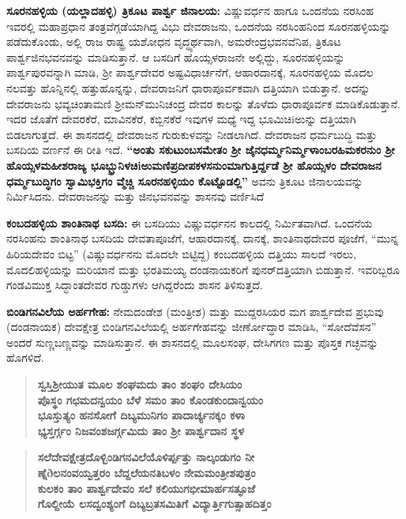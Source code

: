 \textbf{ಸೂರನಹಳ್ಳಿಯ (ಯಲ್ಲಾದಹಳ್ಳಿ) ತ್ರಿಕೂಟ ಪಾರ್ಶ್ವ ಜಿನಾಲಯ:} ವಿಷ್ಣುವರ್ಧನ ಹಾಗೂ ಒಂದನೆಯ ನರಸಿಂಹ ಇವರಲ್ಲಿ ಮಹಾಪ್ರಧಾನ ತಂತ್ರವೆಗ್ಗಡೆಯಾಗಿದ್ದ ವಿಭು ದೇವರಾಜನು, ಒಂದನೆಯ ನರಸಿಂಹನಿಂದ ಸೂರನಹಳ್ಳಿಯನ್ನು ಪಡೆದುಕೊಂಡು, ಅಲ್ಲಿ ರಾಜ ರಾಷ್ಟ್ರ ಯಶೋಧನ ವೃದ್ಧ್ಯರ್ಥವಾಗಿ, ಅಮರೇಂದ್ರಭವನವೆನಿಪ, ತ್ರಿಕೂಟ ಪಾರ್ಶ್ವಜಿನಭವನವನ್ನು ಮಾಡಿಸುತ್ತಾನೆ. ಆ ಬಸದಿಗೆ ಹೊಯ್ಸಳರಾಜನೇ ಅಲ್ಲಿದ್ದು, ಸೂರನಹಳ್ಳಿಯನ್ನು ಪಾರ್ಶ್ವಪುರವನ್ನಾಗಿ ಮಾಡಿ, ಶ‍್ರೀ ಪಾರ್ಶ್ವದೇವರ ಅಷ್ಟವಿಧಾರ್ಚನೆಗೆ, ಆಹಾರದಾನಕ್ಕೆ, ಸೂರನಹಳ್ಳಿಯ ಮೊದಲ ನಲವತ್ತು ಹೊನ್ನಿನಲ್ಲಿ ಹತ್ತುಹೊನ್ನನ್ನು, ದೇವರಾಜನಿಗೆ ಧಾರಾಪೂರ್ವಕವಾಗಿ ದತ್ತಿಯಾಗಿ ಬಿಡುತ್ತಾನೆ. ಅದನ್ನು ದೇವರಾಜನು ಭವ್ಯಚಿಂತಾಮಣಿ ಶ‍್ರೀಮನ್​ಮುನಿಚಂದ್ರ ದೇವರ ಕಾಲನ್ನು ತೊಳೆದು ಧಾರಾಪೂರ್ವಕ ಮಾಡಿಕೊಡುತ್ತಾನೆ. ಇದರ ಜೊತೆಗೆ ದೇವರಕೆರೆ, ಮಾವಿನಕೆರೆ, ಕಬ್ಬಿನಕೆರೆ ಇವುಗಳ ಮಧ್ಯೆ ಇದ್ದ ಭೂಮಿಚಿiಅುನ್ನು ದತ್ತಿಯಾಗಿ ಬಿಡಲಾಗುತ್ತದೆ. ಈ ಶಾಸನದಲ್ಲಿ ದೇವರಾಜನ ಗುರುಕುಳವನ್ನು ನೀಡಲಾಗಿದೆ. ದೇವರಾಜನ ಧರ್ಮಬುದ್ಧಿ ಮತ್ತು ಬಸದಿಯ ವರ್ಣನೆ ಈ ರೀತಿ ಇದೆ. \textbf{“ಅಂತು ಸಕುಟುಂಬಸಮೇತಂ ಶ‍್ರೀ ಜೈನಧರ್ಮ್ಮನಿರ್ಮ್ಮಳಾಂಬರಹಿಮಕರನುಂ ಶ‍್ರೀ ಹೊಯ್ಸಳಮಹೀಶರಾಜ್ಯ ಭೂಭ್ಭ್ರುನಿಳಚಿiಅುಮಣಿಪ್ರದೀಪಕಳಸನುಂಮಾಗುತ್ತಿರ್ದ್ದಡೆ ಶ‍್ರೀ ಹೊಯ್ಸಳಂ ದೇವರಾಜನ ಧರ್ಮ್ಮಬುದ್ಧಿಗಂ ಸ್ವಾಮಿಭಕ್ತಿಗಂ ವ್ಮೆಚ್ಚಿ ಸೂರನಹಳ್ಳಿಯಂ ಕೊಟ್ಟೊಡಲ್ಲಿ” }ಅವನು ತ್ರಿಕೂಟ ಜಿನಾಲಯವನ್ನು ನಿರ್ಮಿಸಿದನು. ದೇವರಾಜನನ್ನು ಮತ್ತು ಜಿನಭವನವನ್ನು ಶಾಸನವು ವರ್ಣಿಸಿದೆ

\textbf{ಕಂಬದಹಳ್ಳಿಯ ಶಾಂತಿನಾಥ ಬಸದಿ:} ಈ ಬಸದಿಯು ವಿಷ್ಣುವರ್ಧನನ ಕಾಲದಲ್ಲಿ ನಿರ್ಮಿತವಾಗಿದೆ. ಒಂದನೆಯ ನರಸಿಂಹನು ಶಾಂತಿನಾಥ ಬಸದಿಯ ದೇವತಾಪೂಜೆಗೆ, ಆಹಾರದಾನಕ್ಕೆ, ದಾನಕ್ಕೆ, ಶಾಂತಿನಾಥದೇವರ ಪೂಜೆಗೆ, “ಮುನ್ನ ಹಿರಿಯದೇವಂ ಬಿಟ್ಟ” (ವಿಷ್ಣುವರ್ಧನನು ಮೊದಲೇ ಬಿಟ್ಟಿದ್ದ) ಕಂಬದಹಳ್ಳಿಯ ದತ್ತಿಯು ಸಾಲದೆ ಇರಲು, ಮೊದಲಿಹಳ್ಳಿಯನ್ನು ಮರಿಯಾನೆ ಮತ್ತು ಭರತಿಮಯ್ಯ ದಂಡನಾಯಕರಿಗೆ ಪುನರ್​ದತ್ತಿಯಾಗಿ ಬಿಡುತ್ತಾನೆ. ಇವರಿಬ್ಬರೂ ಗಂಡವಿಮುಕ್ತ ಸಿದ್ಧಾಂತದೇವರ ಗುಡ್ಡುಗಳು ಆಗಿದ್ದರೆಂದು ಶಾಸನ ತಿಳಿಸುತ್ತದೆ.

\textbf{ಬಿಂಡಿಗನವಿಲೆಯ ಅರ್ಹಗೇಹ:} ನೇಮದಂಡೇಶ (ಮಂತ್ರೀಶ) ಮತ್ತು ಮುದ್ದರಸಿಯರ ಮಗ ಪಾರ್ಶ್ವದೇವ ಪ್ರಭುವು (ದಂಡನಾಯಕ) ದೇವಕ್ಷೇತ್ರ ಬಿಂಡಿಗನವಿಲೆಯಲ್ಲಿ ಅರ್ಹಗೇಹವನ್ನು ಜೀರ್ಣೋದ್ಧಾರ ಮಾಡಿಸಿ, “ಸೋದೆವೆಸನ” ಅಂದರೆ ಸುಣ್ಣಬಣ್ಣವನ್ನು ಮಾಡಿಸುತ್ತಾನೆ. ಈ ಶಾಸನದಲ್ಲಿ ಮೂಲಸಂಘ, ದೇಸಿಗಗಣ ಮತ್ತು ಪೊಸ್ತಕ ಗಚ್ಛವನ್ನು ಹೊಗಳಿದೆ.

\begin{verse}
\textbf{ಸ್ವಸ್ತಿಶ‍್ರೀಯುತ ಮೂಲ ಶಂಘಮದು ತಾಂ ಶಂಘಂ ದೇಸಿಯಂ} \\\textbf{ಪೊಸ್ಥಂ ಗಛಮದನ್ವಯಂ ಬೆಳೆ ಸಮಂ ತಾಂ ಕೊಂಡಕುಂದಾನ್ವಯಂ} \\\textbf{ಭೂಸ್ತುತ್ಯಂ ಹನಸೋಗೆ ದಿಬ್ಯಮುನಿಗಂ ಪಾದಾರ್ಚ್ಯನಕ್ಕಂ ಕಳಾ} \\\textbf{ಭ್ಯಸ್ತರ್ಗ್ಗಂ ನಿಜವಂಶಜರ್ಗ್ಗಮಿದು ತಾಂ ಶ‍್ರೀ ಪಾರ್ಶ್ವದಾನ ಸ್ಥಳ}
\end{verse}

\begin{verse}
\textbf{ಸಲೆದೇವಕ್ಷೇತ್ರದೊಳ್ಬಿಂಡಿಗನವಿಲೆಯೊಳಿರ್ಪ್ಪತ್ತು ನಾಲ್ಕಂಡುಗಂ ನೀ} \\\textbf{ಣ್ನೆðಲನಂವಯ್ವತ್ತರಂ ಬೆದ್ದಲೆಯನತಿಬಳಂ ನೇಮಮಂತ್ರೀಶಪುತ್ರಂ} \\\textbf{ಕುಲಕಂ ತಾಂ ಪಾರ್ಶ್ವದೇವಂ ಸಲೆ ಕಲಿಯುಗಭೀಮಾರ್ಹಸತ್ಫೂಜೆ} \\\textbf{ಗೊಲ್ದೀಯೆ ಲಸದ್ವಂಶ್ಯಂಗೆ ದಿಬ್ಯಬ್ರತಸಮಿತಿಗೆ ವಿದ್ಯಾರ್ತ್ತಿಗುತ್ಸಾಹದಿತ್ತಂ}
\end{verse}

